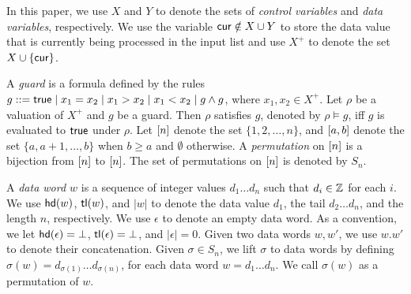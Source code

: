 In this paper, we use $X$ and $Y$ to denote the sets of \emph{control variables} and \emph{data variables}, respectively. We use the variable $\mathsf{cur} \notin X\cup Y$ to store the data value that is currently being processed in the input list and use $X^+$ to denote the set $X\cup \{\mathsf{cur}\}$.

A \emph{guard} is a formula defined by the rules $g::= \mathsf{true} \mid x_1 = x_2 \mid x_1 > x_2 \mid x_1 < x_2 \mid g \wedge g$, where $x_1,x_2 \in X^+$.
%
%
Let $\rho$ be a valuation of $X^+$ and $g$ be a guard. Then $\rho$ satisfies $g$, denoted by $\rho \models g$, iff $g$ is evaluated to $\mathsf{true}$ under $\rho$. 
Let $[n]$ denote the set $\{ 1, 2, \dots, n \}$, and $[a,b]$ denote the set $\{ a, a+1, \dots, b \}$ when $b\geq a$ and $\emptyset$ otherwise. A \emph{permutation} on
$[n]$ is a bijection from $[n]$ to
$[n]$. The set of
permutations on $[n]$ is denoted by $S_n$.

A \emph{data word $w$} is a sequence of integer values $d_1\dots d_n$ such that $d_i \in {\mathbb{Z} }$ for each $i$.
We use $\mathsf{hd}(w)$, $\mathsf{tl}(w)$, and $|w|$ to denote the data value $d_1$, the tail $d_2\dots d_n$, and the length $n$, respectively.
We use $\epsilon$ to denote an empty data word. As a convention, we let $\mathsf{hd}(\epsilon)=\bot$, $\mathsf{tl}(\epsilon)=\bot$, and $|\epsilon|=0$.
Given two data words $w,w'$, we use $w.w'$ to denote their concatenation.
Given $\sigma \in S_n$, we lift $\sigma$ to data words by defining $\sigma(w)=d_{\sigma(1)} \dots d_{\sigma(n)}$, for each data word $w=d_1\dots d_n$. We call $\sigma(w)$ as a permutation of $w$.